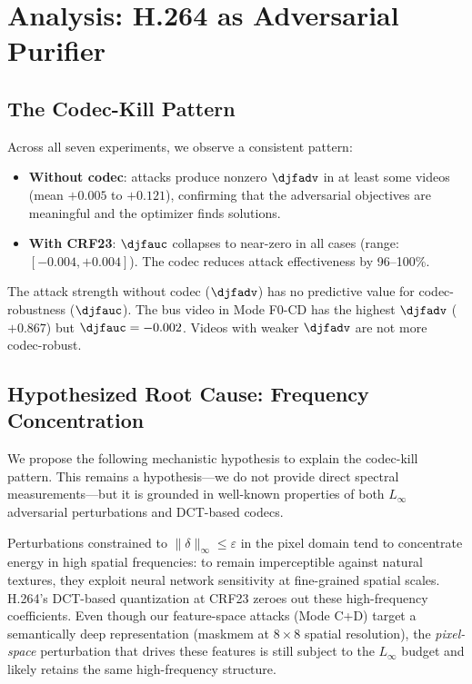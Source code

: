 \section{Analysis: H.264 as Adversarial Purifier}
\label{sec:analysis}

\subsection{The Codec-Kill Pattern}

Across all seven experiments, we observe a consistent pattern:
\begin{itemize}
  \item \textbf{Without codec}: attacks produce nonzero $\djfadv$ in at least some videos (mean $+0.005$ to $+0.121$), confirming that the adversarial objectives are meaningful and the optimizer finds solutions.
  \item \textbf{With CRF23}: $\djfauc$ collapses to near-zero in all cases (range: $[-0.004, +0.004]$). The codec reduces attack effectiveness by 96--100\%.
\end{itemize}

The attack strength without codec ($\djfadv$) has no predictive value for codec-robustness ($\djfauc$). The bus video in Mode F0-CD has the highest $\djfadv$ ($+0.867$) but $\djfauc = -0.002$. Videos with weaker $\djfadv$ are not more codec-robust.

\subsection{Hypothesized Root Cause: Frequency Concentration}

We propose the following mechanistic hypothesis to explain the codec-kill pattern. This remains a hypothesis---we do not provide direct spectral measurements---but it is grounded in well-known properties of both $L_\infty$ adversarial perturbations and DCT-based codecs.

Perturbations constrained to $\|\delta\|_\infty \leq \varepsilon$ in the pixel domain tend to concentrate energy in high spatial frequencies: to remain imperceptible against natural textures, they exploit neural network sensitivity at fine-grained spatial scales. H.264's DCT-based quantization at CRF23 zeroes out these high-frequency coefficients. Even though our feature-space attacks (Mode C+D) target a semantically deep representation (maskmem at $8 \times 8$ spatial resolution), the \emph{pixel-space} perturbation that drives these features is still subject to the $L_\infty$ budget and likely retains the same high-frequency structure.

